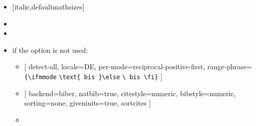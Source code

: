 \begin{multicols}{2}
\begin{itemize}
    \item {} [italic,defaultmathsizes]
    \item {}
    \item {}
    \item if the  option is not used:
      \begin{itemize}
        \item {}
          [%
            detect-all, locale=DE,
            per-mode=reciprocal-positive-first, range-phrase=%
            \verb|{\ifmmode|\hskip0pt
            \verb|\text{ bis }\else|\hskip0pt
            \verb|\ bis \fi}|%
          ]
        \item {}
          [%
            backend=biber, natbib=true, citestyle=numeric, bibstyle=numeric,
            sorting=none, giveninits=true, sortcites%
          ]
        \item {}
      \end{itemize}
  \end{itemize}
\end{multicols}%
